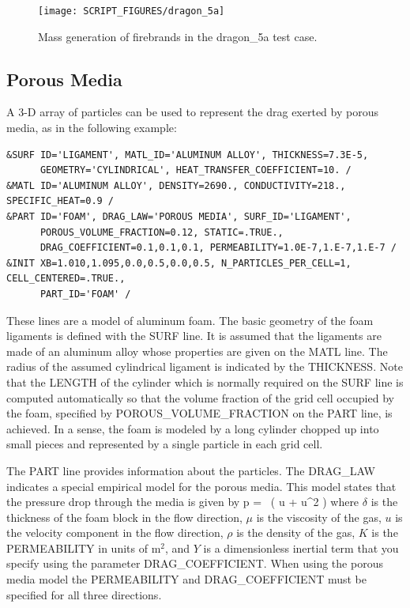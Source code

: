 \documentclass[11pt]{book}
\begin{document}
\begin{figure}[ht]
\begin{center}
\texttt{[image: SCRIPT\_FIGURES/dragon\_5a]}
\end{center}
\caption[Mass generation of firebrands in the {\ct dragon\_5a} test case]{Mass generation of firebrands in the {\ct dragon\_5a} test case.}
\label{dragon_5a_fig}
\end{figure}

\subsection{Porous Media}
\label{info:porous_media}

A 3-D array of particles can be used to represent the drag exerted by porous media, as in the following example:
\begin{lstlisting}
&SURF ID='LIGAMENT', MATL_ID='ALUMINUM ALLOY', THICKNESS=7.3E-5,
      GEOMETRY='CYLINDRICAL', HEAT_TRANSFER_COEFFICIENT=10. /
&MATL ID='ALUMINUM ALLOY', DENSITY=2690., CONDUCTIVITY=218., SPECIFIC_HEAT=0.9 /
&PART ID='FOAM', DRAG_LAW='POROUS MEDIA', SURF_ID='LIGAMENT',
      POROUS_VOLUME_FRACTION=0.12, STATIC=.TRUE.,
      DRAG_COEFFICIENT=0.1,0.1,0.1, PERMEABILITY=1.0E-7,1.E-7,1.E-7 /
&INIT XB=1.010,1.095,0.0,0.5,0.0,0.5, N_PARTICLES_PER_CELL=1, CELL_CENTERED=.TRUE.,
      PART_ID='FOAM' /
\end{lstlisting}
These lines are a model of aluminum foam. The basic geometry of the foam ligaments is defined with the {\ct SURF} line. It is assumed that the ligaments are made of an aluminum alloy whose properties are given on the {\ct MATL} line. The radius of the assumed cylindrical ligament is indicated by the {\ct THICKNESS}. Note that the {\ct LENGTH} of the cylinder which is normally required on the {\ct SURF} line is computed automatically so that the volume fraction of the grid cell occupied by the foam, specified by {\ct POROUS\_VOLUME\_FRACTION} on the {\ct PART} line, is achieved. In a sense, the foam is modeled by a long cylinder chopped up into small pieces and represented by a single particle in each grid cell.

The {\ct PART} line provides information about the particles. The {\ct DRAG\_LAW} indicates a special empirical model for the porous media. This model states that the pressure drop through the media is given by
\be
   \Delta p =  \delta \, \left( u + \rho {} u^2 \right)
\ee
where $\delta$ is the thickness of the foam block in the flow direction, $\mu$ is the viscosity of the gas, $u$ is the velocity component in the flow direction, $\rho$ is the density of the gas, $K$ is the {\ct PERMEABILITY} in units of m$^2$, and $Y$ is a dimensionless inertial term that you specify using the parameter {\ct DRAG\_COEFFICIENT}.  When using the porous media model the {\ct PERMEABILITY} and {\ct DRAG\_COEFFICIENT} must be specified for all three directions.
\end{document}
